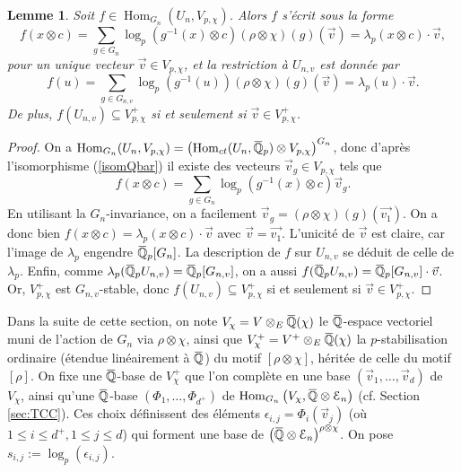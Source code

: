 \documentclass[12pt]{amsart}
\newcommand\bQ{\mathbb{Q}}
\newcommand\cE{\mathcal{E}}
\newcommand{\ob}[1]{\mkern 1.5mu\overline{\mkern-1.5mu#1\mkern-1.5mu}\mkern 1.5mu}
\DeclareMathOperator{\Hom}{Hom}
\theoremstyle{defstyle}
\theoremstyle{thmstyle}
\newtheorem{lemme}[subsubsection]{Lemme}
\begin{document}
\begin{lemme}\label{lem:description_morphismes_Qpbar}
	Soit $f \in \Hom_{G_n}(U_n,V_{p,\chi})$. Alors $f$ s'écrit sous la forme 
	$$f(x\otimes c) = \sum_{g \in G_n} \log_p \left(g^{-1}(x)\otimes c \right)\left(\rho\otimes\chi\right)(g)(\vec{v}) = \lambda_p(x\otimes c) \cdot \vec{v}, $$ 
	pour un unique vecteur $\vec{v}\in V_{p,\chi}$, et la restriction à $U_{n,v}$ est donnée par 
	$$f(u) = \sum_{g\in G_{n,v}}  \log_p\left(g^{-1}(u)\right)\left(\rho\otimes\chi\right)(g)(\vec{v}) = \lambda_p(u)\cdot \vec{v}. $$
	De plus, $f(U_{n,v}) \subseteq V_{p,\chi}^+$ si et seulement si $\vec{v}\in V_{p,\chi}^+$.
\end{lemme}
\begin{proof}
	On a $\Hom_{G_n}(U_n,V_{p,\chi}) = \left(\Hom_{\textrm{ct}}(U_n,\ob{\bQ}_p) \otimes V_{p,\chi} \right)^{G_n}$, donc d'après l'isomorphisme (\ref{isomQbar}) il existe des vecteurs $\vec{v}_g \in V_{p,\chi}$ tels que 
	$$f(x\otimes c) = \sum_{g \in G_n} \log_p \left(g^{-1}(x)\otimes c \right)\vec{v}_g.$$
	En utilisant la $G_n$-invariance, on a facilement $\vec{v}_g = \left(\rho\otimes\chi\right)(g)(\vec{v_1})$. 
	On a donc bien $f(x\otimes c) = \lambda_p(x\otimes c) \cdot \vec{v}$ avec $\vec{v}=\vec{v_1}$. 
	L'unicité de $\vec{v}$ est claire, car l'image de $\lambda_p$ engendre $\ob{\bQ}_p[G_n]$. 
	La description de $f$ sur $U_{n,v}$ se déduit de celle de $\lambda_p$. 
	Enfin, comme $\lambda_p(\ob{\bQ}_p U_{n,v})=\ob{\bQ}_p[G_{n,v}]$, on a aussi $f(\ob{\bQ}_p U_{n,v}) = \ob{\bQ}_p[G_{n,v}] \cdot \vec{v}$. 
	Or, $V_{p,\chi}^+$ est $G_{n,v}$-stable, donc $f(U_{n,v}) \subseteq V_{p,\chi}^+$ si et seulement si $\vec{v}\in V_{p,\chi}^+$.
\end{proof}

Dans la suite de cette section, on note $V_\chi = V \otimes_E \ob{\bQ}(\chi)$ le $\ob{\bQ}$-espace vectoriel muni de l'action de $G_n$ via $\rho\otimes \chi$, ainsi que $V^+_\chi=V^+ \otimes_E \ob{\bQ}(\chi)$ la $p$-stabilisation ordinaire (étendue linéairement à $\ob{\bQ}$) du motif $[\rho\otimes \chi]$, héritée de celle du motif $[\rho]$. On fixe une $\ob{\bQ}$-base de $V^+_\chi$ que l'on complète en une base $(\vec{v}_1,\ldots,\vec{v}_d)$ de $V_\chi$, ainsi qu'une $\ob{\bQ}$-base $(\Phi_1,\ldots,\Phi_{d^+})$ de $\Hom_{G_n}\left(V_{\chi}, \ob{\bQ} \otimes \cE_n \right)$ (cf. Section \ref{sec:TCC}). Ces choix définissent des éléments $\epsilon_{i,j}=\Phi_i(\vec{v}_j)$ (où $1\leq i \leq d^+, 1\leq j \leq d$) qui forment une base de $\left(\ob{\bQ}\otimes \cE_n \right)^{\rho\otimes\chi}$. On pose $s_{i,j}:=\log_p(\epsilon_{i,j})$.
\end{document}
